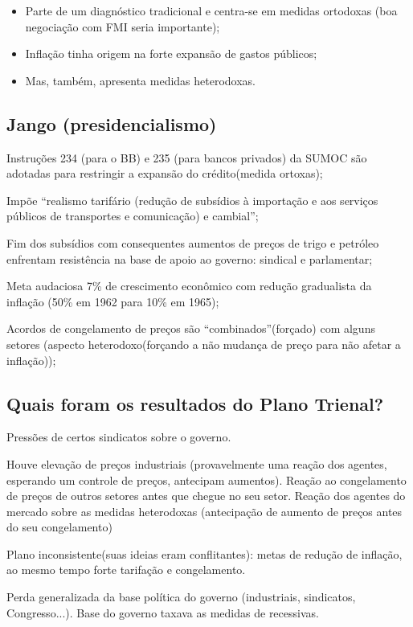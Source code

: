\documentclass[a4paper,12pt]{article}[abntex2]
\begin{document}
\begin{itemize}
    \item Parte de um diagnóstico tradicional e centra-se em medidas ortodoxas (boa negociação com FMI seria importante);
    \item Inflação tinha origem na forte expansão de gastos públicos;
    \item Mas, também, apresenta medidas heterodoxas.
\end{itemize}

\subsection{\textbf{Jango (presidencialismo)}}

Instruções 234 (para o BB) e 235 (para bancos privados) da SUMOC são adotadas para restringir a expansão do crédito(medida ortoxas);

Impõe “realismo tarifário (redução de subsídios à importação e aos serviços públicos de transportes e comunicação) e cambial”; 

Fim dos subsídios com consequentes aumentos de preços de trigo e petróleo enfrentam resistência na base de apoio ao governo: sindical e parlamentar;

Meta audaciosa 7\% de crescimento econômico com redução gradualista da inflação (50\% em 1962 para 10\% em 1965);

Acordos de congelamento de preços são “combinados”(forçado) com alguns setores (aspecto heterodoxo(forçando a não mudança de preço para não afetar a inflação));

\subsection{\textbf{Quais foram os resultados do Plano Trienal?}}

Pressões de certos sindicatos sobre o governo.

Houve elevação de preços industriais (provavelmente uma reação dos agentes, esperando um controle de preços, antecipam aumentos). Reação ao congelamento de preços de outros setores antes que chegue no seu setor. Reação dos agentes do mercado sobre as medidas heterodoxas (antecipação de aumento de preços antes do seu congelamento)

Plano inconsistente(suas ideias eram conflitantes): metas de redução de inflação, ao mesmo tempo  forte tarifação e congelamento.

Perda generalizada da base política do governo (industriais, sindicatos, Congresso...). Base do governo taxava as medidas de recessivas. 
\end{document}
